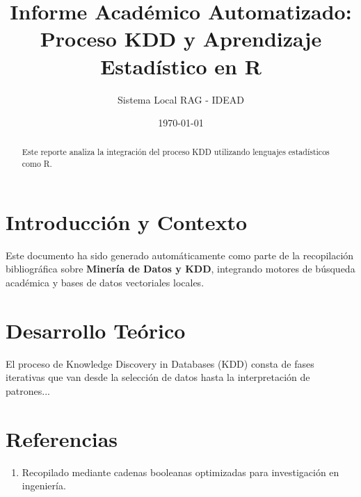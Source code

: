 \documentclass[12pt,a4paper]{article}
\title{\textbf{Informe Académico Automatizado: Proceso KDD y Aprendizaje Estadístico en R}}
\author{Sistema Local RAG - IDEAD}
\date{\today}
\begin{document}
\maketitle

\begin{abstract}
Este reporte analiza la integración del proceso KDD utilizando lenguajes estadísticos como R.
\end{abstract}

\section{Introducción y Contexto}
Este documento ha sido generado automáticamente como parte de la recopilación bibliográfica sobre \textbf{Minería de Datos y KDD}, integrando motores de búsqueda académica y bases de datos vectoriales locales.

\section{Desarrollo Teórico}
El proceso de Knowledge Discovery in Databases (KDD) consta de fases iterativas que van desde la selección de datos hasta la interpretación de patrones...

\section{Referencias}
\begin{enumerate}
    \item Recopilado mediante cadenas booleanas optimizadas para investigación en ingeniería.
\end{enumerate}
\end{document}
